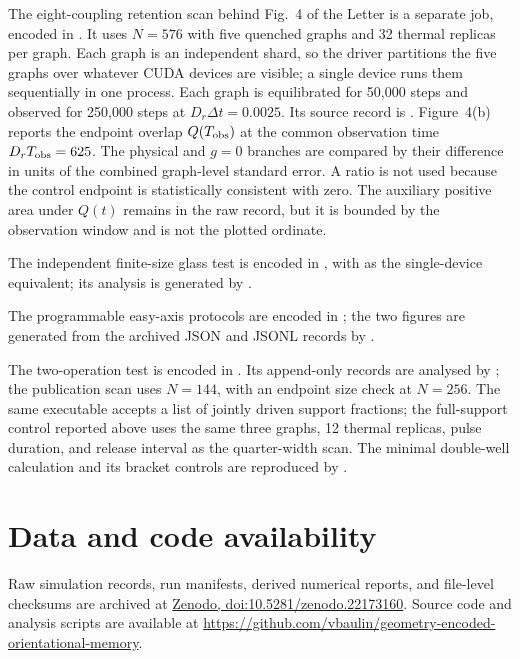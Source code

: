 \documentclass[aps,prl,onecolumn,superscriptaddress,nofootinbib]{revtex4-2}
\begin{document}
The eight-coupling retention scan behind Fig.~4 of the Letter is a separate
job, encoded in
.
It uses \(N=576\) with five quenched graphs and 32 thermal replicas per
graph.  Each graph is an independent shard, so the driver partitions the five
graphs over whatever CUDA devices are visible; a single device runs them
sequentially in one process.  Each graph is equilibrated for 50,000 steps and
observed for 250,000 steps at
\(D_r\Delta t=0.0025\). Its source record is
. Figure~4(b) reports the endpoint overlap
\(Q(T_{\rm obs})\) at the common observation time
\(D_rT_{\rm obs}=625\). The physical and \(g=0\) branches are compared by
their difference in units of the combined graph-level standard error. A ratio
is not used because the control endpoint is statistically consistent with
zero. The auxiliary positive area under \(Q(t)\) remains in the raw record,
but it is bounded by the observation window and is not the plotted ordinate.

The independent finite-size glass test is encoded in
, with
 as the
single-device equivalent; its analysis is generated by
.

The programmable easy-axis protocols are encoded in
; the two figures are
generated from the archived JSON and JSONL records by
.

The two-operation test is encoded in
.  Its
append-only records are analysed by
; the
publication scan uses \(N=144\), with an endpoint size check at \(N=256\).
The same executable accepts a list of jointly driven support fractions; the
full-support control reported above uses the same three graphs, 12 thermal
replicas, pulse duration, and release interval as the quarter-width scan.
The minimal double-well calculation and its bracket controls are reproduced
by .

\section*{Data and code availability}
Raw simulation records, run manifests, derived numerical reports, and
file-level checksums are archived at
\href{https://doi.org/10.5281/zenodo.22173160}{Zenodo,
doi:10.5281/zenodo.22173160}. Source code and analysis scripts are available
at \url{https://github.com/vbaulin/geometry-encoded-orientational-memory}.
\end{document}
